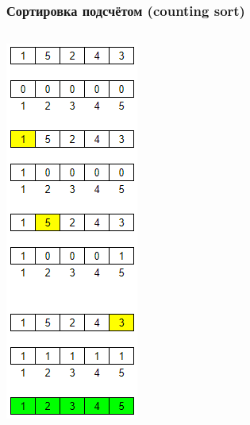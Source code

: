 \documentclass[xetex,mathserif,serif]{beamer}
\begin{document}
	\begin{frame}
		\frametitle{Сортировка подсчётом (counting sort)}
		\begin{columns}
			\begin{column}{0.2\textwidth}
				\includegraphics[width=\textwidth]{countSort.png}

\end{column}
\end{columns}
\end{frame}
\end{document}
